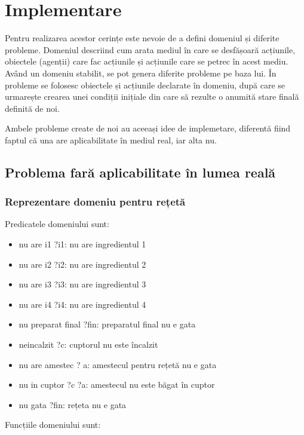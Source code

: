  \section{Implementare}

Pentru realizarea acestor cerințe este nevoie de a defini domeniul și diferite probleme. Domeniul descriind cum arata mediul în care se desfășoară acțiunile, obiectele (agenții) care fac acțiunile și acțiunile care se petrec în acest mediu. Având un domeniu stabilit, se pot genera diferite probleme pe baza lui. În probleme se folosesc obiectele și acțiunile declarate în domeniu, după care se urmarește crearea unei condiții inițiale din care să rezulte o anumită stare finală  definită de noi.

Ambele probleme create de noi au aceeași idee de implemetare, diferentă fiind faptul că una are aplicabilitate în mediul real, iar alta nu.
\newline

\newline
\subsection{Problema fară aplicabilitate în lumea reală}
\subsubsection{Reprezentare domeniu pentru rețetă}
Predicatele domeniului sunt:
 \begin{itemize}
    \setlength\itemsep{0em}
    \item nu are i1 ?i1: nu are ingredientul 1
    \item nu are i2 ?i2: nu are ingredientul 2
    \item nu are i3 ?i3: nu are ingredientul 3
    \item nu are i4 ?i4: nu are ingredientul 4
    \item nu preparat final ?fin: preparatul final nu e gata
    \item neincalzit ?c: cuptorul nu este încalzit
    \item nu are amestec ? a: amestecul pentru rețetă nu e gata
    \item nu in cuptor ?c ?a: amestecul nu este băgat în cuptor
    \item nu gata ?fin:  rețeta nu e gata
  


\end{itemize}
Funcțiile domeniului sunt:

